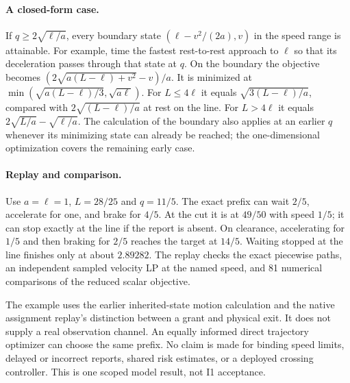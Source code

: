 \documentclass[11pt]{article}
\begin{document}
\paragraph{A closed-form case.}
If \(q\ge 2\sqrt{\ell/a}\), every boundary state
\((\ell-v^2/(2a),v)\) in the speed range is attainable. For example,
time the fastest rest-to-rest approach to \(\ell\) so that its
deceleration passes through that state at \(q\). On the boundary the
objective becomes
\((2\sqrt{a(L-\ell)+v^2}-v)/a\).
It is minimized at \(\min(\sqrt{a(L-\ell)/3},\sqrt{a\ell})\).
For \(L\le4\ell\) it equals \(\sqrt{3(L-\ell)/a}\), compared
with \(2\sqrt{(L-\ell)/a}\) at rest on the line. For \(L>4\ell\)
it equals \(2\sqrt{L/a}-\sqrt{\ell/a}\). The calculation of the
boundary also applies at an earlier \(q\) whenever its minimizing
state can already be reached; the one-dimensional optimization
covers the remaining early case.

\paragraph{Replay and comparison.}
Use \(a=\ell=1\), \(L=28/25\) and \(q=11/5\). The exact prefix
can wait \(2/5\), accelerate for one, and brake for \(4/5\).
At the cut it is at \(49/50\) with speed \(1/5\); it can stop
exactly at the line if the report is absent. On clearance,
accelerating for \(1/5\) and then braking for \(2/5\) reaches the
target at \(14/5\). Waiting stopped at the line finishes only
at about \(2.89282\). The replay checks the exact piecewise paths,
an independent sampled velocity LP at the named speed, and
81 numerical comparisons of the reduced scalar objective.

The example uses the earlier inherited-state motion calculation
and the native assignment replay's distinction between a grant
and physical exit. It does not supply a real observation channel.
An equally informed direct trajectory optimizer can choose the
same prefix. No claim is made for binding speed limits, delayed
or incorrect reports, shared risk estimates, or a deployed
crossing controller. This is one scoped model result, not I1 acceptance.
\end{document}
